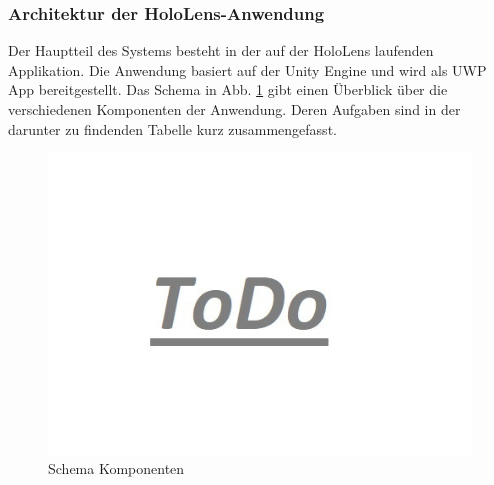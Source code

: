 \subsubsection{Architektur der HoloLens-Anwendung}
Der Hauptteil des Systems besteht in der auf der HoloLens laufenden Applikation. Die Anwendung basiert auf der Unity Engine und wird als UWP App bereitgestellt. Das Schema in Abb. \ref{img:components-schema} gibt einen Überblick über die verschiedenen Komponenten der Anwendung. Deren Aufgaben sind in der darunter zu findenden Tabelle kurz zusammengefasst.

\begin{figure}[H]
	\centering
	\includegraphics[width=1\textwidth]{images/todo.jpg}
	\caption{Schema Komponenten}
	\label{img:components-schema}
\end{figure}


